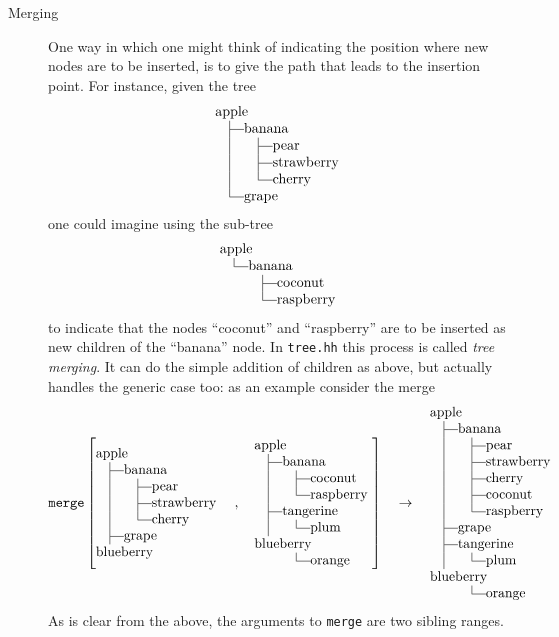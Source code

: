\documentclass[11pt]{article}
\newcommand{\member}[1]{{\tt #1}\index{#1}}
\def\mystrut{\vbox to 8.5pt{}\vtop to 3.5pt{}}
\def\V{\hskip10pt\vrule\hskip10pt}
\def\T{\hskip10pt\vrule\vrule height2.5pt depth -2.1pt width 10pt}
\def\L{\hskip10pt\vrule height 8.5pt depth -2.1pt
       \vrule height2.5pt depth -2.1pt width 10pt}
\def\N{\hskip10pt\phantom{\vrule}\hskip10pt}
\def\hw{\hskip-1000pt plus 1fil}
\begin{document}
\begin{sectionunit}
\begin{sectionunit}
\begin{description}
\item[Merging] One way in which one might think of indicating the
position where new nodes are to be inserted, is to give the path that
leads to the insertion point.  For instance, given the tree
\begin{equation*}
\vcenter{\offinterlineskip
\halign{&#\mystrut\hfil\cr
 apple \hw\cr
 \T banana\cr
 \V   \T  pear \cr
 \V   \T  strawberry \cr
 \V   \L  cherry \cr
 \L grape\cr}}
\end{equation*}
one could imagine using the sub-tree
\begin{equation*}
\vcenter{\offinterlineskip
\halign{&#\mystrut\hfil\cr
 apple \hw\cr
 \L banana\cr
 \N   \T  coconut \cr
 \N   \L  raspberry \cr}}
\end{equation*}
to indicate that the nodes ``coconut'' and ``raspberry'' are to be
inserted as new children of the ``banana'' node. In {\tt tree.hh} this
process is called \emph{tree merging}. It can do the simple addition
of children as above, but actually handles the generic case too: as
an example consider the merge
\begin{equation*}
\text{\tt merge}\left[
\vcenter{\offinterlineskip
\halign{&#\mystrut\hfil\cr
 apple \hw\cr
 \T banana\cr
 \V   \T  pear \cr
 \V   \T  strawberry \cr
 \V   \L  cherry \cr
 \T grape\cr
 blueberry \cr}}\quad, \quad
\vcenter{\offinterlineskip
\halign{&#\mystrut\hfil\cr
 apple \hw\cr
 \T banana\cr
 \V   \T coconut \cr
 \V   \L raspberry \cr
 \T tangerine \cr
 \V   \L plum\cr
 blueberry \cr
 \N   \L orange \cr}}\right]\quad\rightarrow\quad
\vcenter{\offinterlineskip
\halign{&#\mystrut\hfil\cr
 apple \hw\cr
 \T banana\cr
 \V   \T pear\cr
 \V   \T strawberry\cr
 \V   \T cherry\cr
 \V   \T coconut \cr
 \V   \L raspberry \cr
 \T grape\cr
 \T tangerine \cr
 \V   \L plum\cr
 blueberry \cr
 \N  \L orange \cr}}
\end{equation*}
As is clear from the above, the arguments to \member{merge} are two
sibling ranges.
\end{description}
\end{sectionunit}
\end{sectionunit}

\printindex
\end{document}
